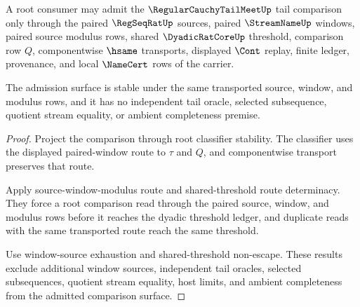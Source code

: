 \begin{theorem}
\label{thm:regular-cauchy-tail-meet-root-tail-comparison-admission}
A root consumer may admit the $\RegularCauchyTailMeetUp$ tail comparison only through the paired $\RegSeqRatUp$ sources, paired $\StreamNameUp$ windows, paired source modulus rows, shared $\DyadicRatCoreUp$ threshold, comparison row $Q$, componentwise $\hsame$ transports, displayed $\Cont$ replay, finite ledger, provenance, and local $\NameCert$ rows of the carrier.

The admission surface is stable under the same transported source, window, and modulus rows, and it has no independent tail oracle, selected subsequence, quotient stream equality, or ambient completeness premise.
\end{theorem}
\begin{proof}
Project the comparison through root classifier stability. The classifier uses the displayed paired-window route to $\tau$ and $Q$, and componentwise transport preserves that route.

Apply source-window-modulus route and shared-threshold route determinacy. They force a root comparison read through the paired source, window, and modulus rows before it reaches the dyadic threshold ledger, and duplicate reads with the same transported route reach the same threshold.

Use window-source exhaustion and shared-threshold non-escape. These results exclude additional window sources, independent tail oracles, selected subsequences, quotient stream equality, host limits, and ambient completeness from the admitted comparison surface.
\end{proof}

